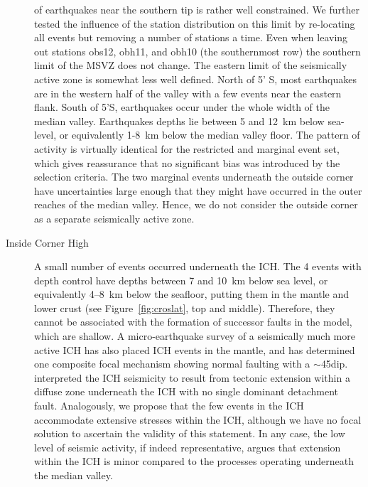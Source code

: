 \documentclass[jgr]{agu2001}
\newlength{\tw}
\begin{document}
\begin{article}
\begin{description}
of earthquakes near the southern tip is rather well constrained.  We
further tested the influence of the station distribution on this limit
by re-locating all events but removing a number of stations a time.
Even when leaving out stations obs12, obh11, and obh10 (the
southernmost row) the southern limit of the MSVZ
does not change.  The eastern limit of the seismically active zone is
somewhat less well defined.  North of 5' S, most earthquakes are
in the western half of the valley with a few events near the eastern
flank.  South of  5'S, earthquakes occur under the whole
width of the median valley. Earthquakes depths lie between 5 and 12~km
below sea-level, or equivalently 1-8~km below the median valley floor.  The pattern
of activity is virtually identical for the restricted and marginal
event set, which gives reassurance that no significant bias was
introduced by the selection criteria.
  The two marginal events
underneath the outside corner have uncertainties large enough that
they might have occurred in the outer reaches of the median valley. Hence, we
do not consider the outside corner as a separate seismically
active zone.

\item[Inside Corner High]  A small number of events occurred
underneath the ICH.  The  4 events with depth control have depths
between 7 and 10~km below sea level, or equivalently 4--8~km
below the seafloor, putting them in the mantle and lower
crust (see Figure~\ref{fig:croslat}, top and middle). 
Therefore, they cannot be associated with the formation of successor
faults in the \citet{tucholke94} model, which are shallow.
A micro-earthquake survey of a  seismically much more active ICH
\citep[at 29\dg N,][]{wolfe95} has also placed ICH events in the
mantle, and has determined one composite focal mechanism showing
normal faulting with a $\sim$45\dg dip.  \citet{wolfe95} interpreted the ICH
seismicity to result from tectonic extension within a
diffuse zone underneath the ICH with no single dominant detachment
fault.  Analogously, we propose that the few events in the ICH
accommodate extensive stresses within the ICH, although we have no focal solution to
ascertain the validity of this statement.  In any case, the low level
of seismic activity, if indeed representative, argues that extension
within the ICH is minor compared to the processes operating underneath the
median valley.


\end{description}
\end{article}
\end{document}
